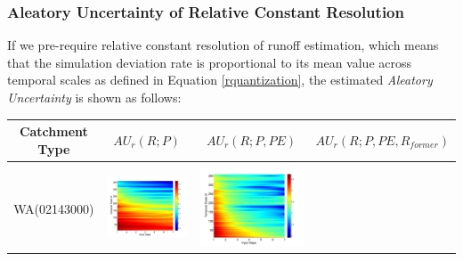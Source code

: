 \documentclass[review]{elsarticle}
\begin{document}
\subsubsection{Aleatory Uncertainty of Relative Constant Resolution}
If we pre-require relative constant resolution of runoff estimation, which means that the simulation deviation rate is proportional to its mean value across temporal scales as  defined in Equation \ref{rquantization}, the estimated \emph{Aleatory Uncertainty} is shown as follows:
\begin{table}[H]  \small 

\label{table:RAU}
\centering
\begin{tabular}{cccc}
\hline
\textbf{Catchment Type}&\textbf{$AU_r(R;P)$}&\textbf{$AU_r(R;P,PE)$}&\textbf{$AU_r(R;P,PE,R_{former})$}\\
\hline
\\
WA(02143000)
&\begin{minipage}{.3\textwidth}\includegraphics[width=\linewidth]{resultgraph/02143000p_rela.png}\end{minipage}
&\begin{minipage}{.3\textwidth}\includegraphics[width=\linewidth]{resultgraph/02143000pep_rela.png}\end{minipage}

\end{tabular}
\end{table}
\end{document}
